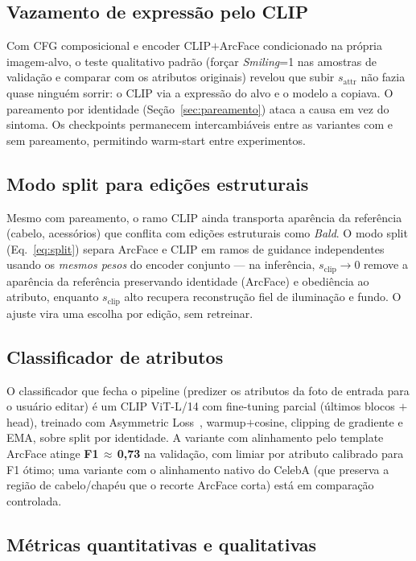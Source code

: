 \documentclass[10pt,twocolumn]{article}
\begin{document}
\subsection{Vazamento de expressão pelo CLIP}

Com CFG composicional e encoder CLIP$+$ArcFace condicionado na própria
imagem-alvo, o teste qualitativo padrão (forçar \emph{Smiling}=1 nas
amostras de validação e comparar com os atributos originais) revelou que
subir $s_{\mathrm{attr}}$ não fazia quase ninguém sorrir: o CLIP via a
expressão do alvo e o modelo a copiava. O pareamento por identidade
(Seção~\ref{sec:pareamento}) ataca a causa em vez do sintoma. Os
checkpoints permanecem intercambiáveis entre as variantes com e sem
pareamento, permitindo warm-start entre experimentos.

\subsection{Modo split para edições estruturais}

Mesmo com pareamento, o ramo CLIP ainda transporta aparência da
referência (cabelo, acessórios) que conflita com edições estruturais como
\emph{Bald}. O modo split (Eq.~\ref{eq:split}) separa ArcFace e CLIP em
ramos de guidance independentes usando os \emph{mesmos pesos} do encoder
conjunto --- na inferência, $s_{\mathrm{clip}} \to 0$ remove a aparência
da referência preservando identidade (ArcFace) e obediência ao atributo,
enquanto $s_{\mathrm{clip}}$ alto recupera reconstrução fiel de
iluminação e fundo. O ajuste vira uma escolha por edição, sem retreinar.

\subsection{Classificador de atributos}
\label{sec:classificador}

O classificador que fecha o pipeline (predizer os atributos da foto de
entrada para o usuário editar) é um CLIP ViT-L/14 com fine-tuning parcial
(últimos blocos $+$ head), treinado com Asymmetric
Loss~\cite{benbaruch2021}, warmup$+$cosine, clipping de gradiente e EMA,
sobre split por identidade. A variante com alinhamento pelo template
ArcFace atinge \textbf{F1\,$\approx$\,0{,}73} na validação, com limiar
por atributo calibrado para F1 ótimo; uma variante com o alinhamento
nativo do CelebA (que preserva a região de cabelo/chapéu que o recorte
ArcFace corta) está em comparação controlada.

\subsection{Métricas quantitativas e qualitativas}
\end{document}
